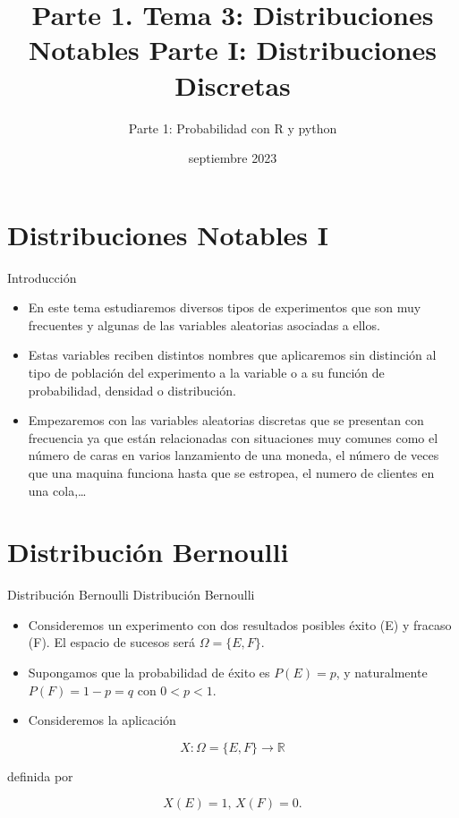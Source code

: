 \documentclass[
  ignorenonframetext,
  aspectratio=169]{beamer}
\title{Parte 1. Tema 3: Distribuciones Notables Parte I: Distribuciones
Discretas}
\author{Parte 1: Probabilidad con R y python}
\date{septiembre 2023}
\providecommand{\tightlist}{%
  \setlength{\itemsep}{0pt}\setlength{\parskip}{0pt}}\usepackage{longtable,booktabs,array}
\begin{document}
\frame{\titlepage}
\hypertarget{distribuciones-notables-i}{%
\section{Distribuciones Notables I}\label{distribuciones-notables-i}}

\begin{frame}{Introducción}
\protect\hypertarget{introducciuxf3n}{}
\begin{itemize}
\item
  En este tema estudiaremos diversos tipos de experimentos que son muy
  frecuentes y algunas de las variables aleatorias asociadas a ellos.
\item
  Estas variables reciben distintos nombres que aplicaremos sin
  distinción al tipo de población del experimento a la variable o a su
  función de probabilidad, densidad o distribución.
\item
  Empezaremos con las variables aleatorias discretas que se presentan
  con frecuencia ya que están relacionadas con situaciones muy comunes
  como el número de caras en varios lanzamiento de una moneda, el número
  de veces que una maquina funciona hasta que se estropea, el numero de
  clientes en una cola,\ldots{}
\end{itemize}
\end{frame}

\hypertarget{distribuciuxf3n-bernoulli}{%
\section{Distribución Bernoulli}\label{distribuciuxf3n-bernoulli}}

\begin{frame}{Distribución Bernoulli}
\protect\hypertarget{distribuciuxf3n-bernoulli-1}{}
Distribución Bernoulli

\begin{itemize}
\tightlist
\item
  Consideremos un experimento con dos resultados posibles éxito (E) y
  fracaso (F). El espacio de sucesos será \(\Omega=\{E,F\}\).
\item
  Supongamos que la probabilidad de éxito es \(P(E)=p\), y naturalmente
  \(P(F)=1-p=q\) con \(0<p<1\).
\item
  Consideremos la aplicación
\end{itemize}

\[
X:\Omega=\{E,F\}\to \mathbb{R}
\]

definida por

\[
X(E)=1\mbox{, }X(F)=0.
\]
\end{frame}
\end{document}
